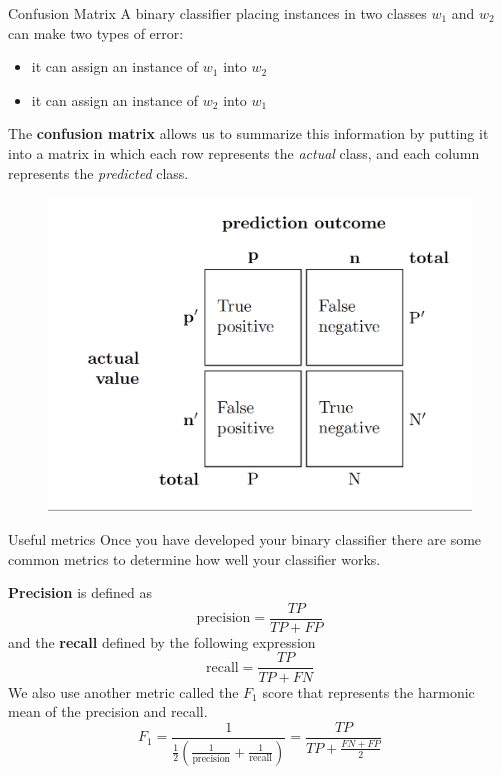 \documentclass{beamer}
\begin{document}
\begin{frame}{Confusion Matrix}
	A binary classifier placing instances in two classes $w_1$ and $w_2$ can make two types of error:
	\begin{itemize}
		\item it can assign an instance of $w_1$ into $w_2$
		\item it can assign an instance of $w_2$ into $w_1$
	\end{itemize}
The {\bf confusion matrix} allows us to summarize this information by putting it into a matrix in which each row represents the {\it actual} class, and each column represents the {\it predicted} class.

\begin{figure}
	\centering
	\includegraphics[scale=0.25]{../../Figures/fig_confusionmatrix.png}
\end{figure}

\end{frame}

\begin{frame}{Useful metrics}
	Once you have developed your binary classifier there are some common metrics to determine how well your classifier works.
	
	{\bf Precision} is defined as
	\begin{equation*}
		\textrm{precision}= \frac{TP}{TP+FP}
	\end{equation*}
	and the {\bf recall}  defined by the following expression
	\begin{equation*}
		\textrm{recall}= \frac{TP}{TP+FN}
	\end{equation*}
We also use another metric called the $F_1$ score that represents the harmonic mean of the precision and recall. 
\begin{equation*}
F_1= \frac{1}{\frac{1}{2}( \frac{1}{\textrm{precision}}+ \frac{1}{\textrm{recall}})}=\frac{TP}{TP+ \frac{FN+FP}{2}}
\end{equation*}
\end{frame}	
\end{document}
